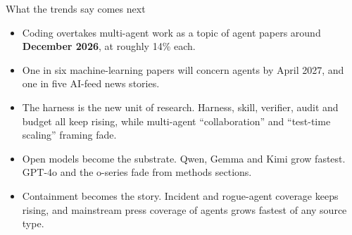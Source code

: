 \documentclass[10.5pt]{article}
\begin{document}
{\vspace{0.7cm}
{\sorasemi\large\color{white}What the trends say comes next\par}\vspace{2pt}
\begin{tcolorbox}[enhanced, colback=deep, colframe=violet!28!deep, boxrule=0.6pt, arc=8pt, left=14pt, right=14pt, top=11pt, bottom=11pt, fontupper=\normalsize\color{silver}\raggedright]
\begin{itemize}[leftmargin=1.3em, itemsep=7pt]
  \item[{\color{violet}1}] {\color{white}Coding overtakes multi-agent work} as a topic of agent papers around \textbf{December 2026}, at roughly 14\% each.
  \item[{\color{violet}2}] {\color{white}One in six machine-learning papers will concern agents} by April 2027, and one in five AI-feed news stories.
  \item[{\color{violet}3}] {\color{white}The harness is the new unit of research.} Harness, skill, verifier, audit and budget all keep rising, while multi-agent \enquote{collaboration} and \enquote{test-time scaling} framing fade.
  \item[{\color{violet}4}] {\color{white}Open models become the substrate.} Qwen, Gemma and Kimi grow fastest. GPT-4o and the o-series fade from methods sections.
  \item[{\color{violet}5}] {\color{white}Containment becomes the story.} Incident and rogue-agent coverage keeps rising, and mainstream press coverage of agents grows fastest of any source type.
\end{itemize}
\end{tcolorbox}
}
\newpage\pagecolor{white}
\setcounter{page}{1}
\end{document}
